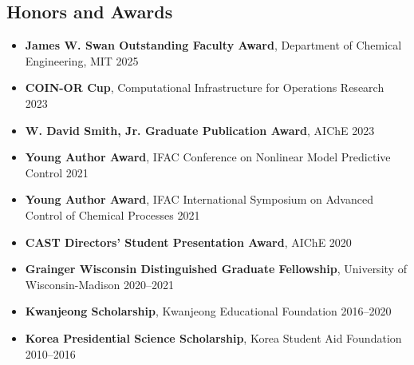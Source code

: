 \subsection*{Honors and Awards}
\begin{itemize}[leftmargin=*,itemsep=0pt]
\item[] \textbf{James W. Swan Outstanding Faculty Award}, Department of Chemical Engineering, MIT \hfill 2025
\item[] \textbf{COIN-OR Cup}, Computational Infrastructure for Operations Research \hfill 2023
\item[] \textbf{W. David Smith, Jr. Graduate Publication Award}, AIChE \hfill 2023
\item[] \textbf{Young Author Award}, IFAC Conference on Nonlinear Model Predictive Control \hfill 2021
\item[] \textbf{Young Author Award}, IFAC International Symposium on Advanced Control of Chemical Processes \hfill 2021
\item[] \textbf{CAST Directors' Student Presentation Award}, AIChE \hfill 2020
\item[] \textbf{Grainger Wisconsin Distinguished Graduate Fellowship}, University of Wisconsin-Madison \hfill 2020--2021
\item[] \textbf{Kwanjeong Scholarship}, Kwanjeong Educational Foundation \hfill 2016--2020
\item[] \textbf{Korea Presidential Science Scholarship}, Korea Student Aid Foundation \hfill 2010--2016
\end{itemize}

